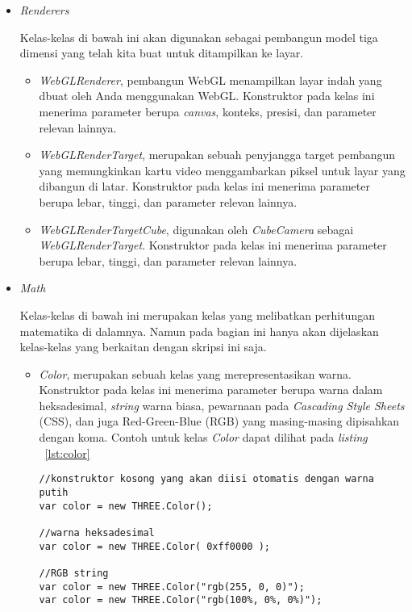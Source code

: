 \begin{itemize}
	\item \textit{Renderers}
	
	Kelas-kelas di bawah ini akan digunakan sebagai pembangun model tiga dimensi yang telah kita buat untuk ditampilkan ke layar.
	
	\begin{itemize}
		\item {\it WebGLRenderer}, pembangun WebGL menampilkan layar indah yang dbuat oleh Anda menggunakan WebGL. Konstruktor pada kelas ini menerima parameter berupa {\it canvas}, konteks, presisi, dan parameter relevan lainnya.
		\item {\it WebGLRenderTarget}, merupakan sebuah penyjangga target pembangun yang memungkinkan kartu video menggambarkan piksel untuk layar yang dibangun di latar. Konstruktor pada kelas ini menerima parameter berupa lebar, tinggi, dan parameter relevan lainnya.
		\item {\it WebGLRenderTargetCube}, digunakan oleh {\it CubeCamera} sebagai {\it WebGLRenderTarget}. Konstruktor pada kelas ini menerima parameter berupa lebar, tinggi, dan parameter relevan lainnya.
	\end{itemize}
	
	
	\item \textit{Math}
	
	Kelas-kelas di bawah ini merupakan kelas yang melibatkan perhitungan matematika di dalamnya. Namun pada bagian ini hanya akan dijelaskan kelas-kelas yang berkaitan dengan skripsi ini saja.
	
	\begin{itemize}
		\item {\it Color}, merupakan sebuah kelas yang merepresentasikan warna. Konstruktor pada kelas ini menerima parameter berupa warna dalam heksadesimal, {\it string} warna biasa, pewarnaan pada {\it Cascading Style Sheets} (CSS), dan juga Red-Green-Blue (RGB) yang masing-masing dipisahkan dengan koma. Contoh untuk kelas {\it Color} dapat dilihat pada {\it listing} ~\ref{lst:color}
\begin{lstlisting}[caption={Contoh-contoh penggunaan kelas {\it Color}.}, label={lst:color},captionpos=b]
//konstruktor kosong yang akan diisi otomatis dengan warna putih
var color = new THREE.Color();

//warna heksadesimal
var color = new THREE.Color( 0xff0000 );

//RGB string
var color = new THREE.Color("rgb(255, 0, 0)");
var color = new THREE.Color("rgb(100%, 0%, 0%)");


\end{lstlisting}
\end{itemize}
\end{itemize}
